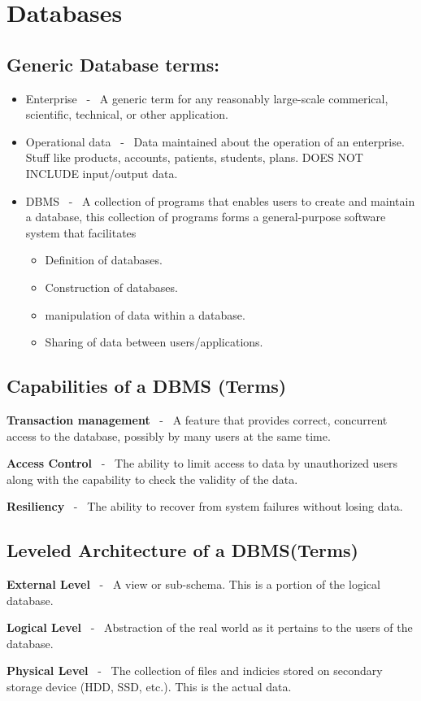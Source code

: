 \documentclass{report}
\begin{document}
\section{Databases}
    \subsection*{Generic Database terms:}
\begin{itemize}
    \item Enterprise \ - \ A generic term for any reasonably large-scale commerical, scientific, technical, or other application.
    \item Operational data \ - \ Data maintained about the operation of an enterprise. Stuff like products, accounts, patients, students, plans. DOES NOT INCLUDE input/output data.
    \item DBMS \ - \ A collection of programs that enables users to create and maintain a database, this collection of programs forms a general-purpose software system that facilitates
        \begin{itemize}[label=$\circ$]
            \item Definition of databases.
            \item Construction of databases.
            \item manipulation of data within a database.
            \item Sharing of data between users/applications.
        \end{itemize}
\end{itemize}
\subsection*{Capabilities of a DBMS (Terms)}
    \item \textbf{Transaction management} \ - \  A feature that provides correct, concurrent access to the database, possibly by many users at the same time.
    \item \textbf{Access Control} \ - \ The ability to limit access to data by unauthorized users along with the capability to check the validity of the data.
    \item \textbf{Resiliency} \ - \ The ability to recover from system failures without losing data.

        \subsection*{Leveled Architecture of a DBMS(Terms)}
    \item \textbf{External Level} \ - \ A view or sub-schema. This is a portion of the logical database.
    \item \textbf{Logical Level} \ - \ Abstraction of the real world as it pertains to the users of the database.
    \item \textbf{Physical Level} \ - \ The collection of files and indicies stored on secondary storage device (HDD, SSD, etc.). This is the actual data.
\end{document}
